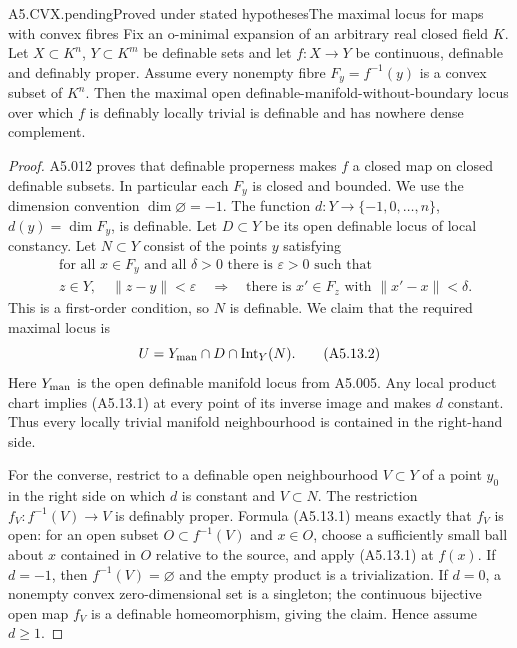\begin{saresult}{A5.CVX.pending}{Proved under stated hypotheses}{The maximal locus for maps with convex fibres}
Fix an o-minimal expansion of an arbitrary real closed field $K$.
Let $X\subset K^n$, $Y\subset K^m$ be definable sets and let
$f:X\to Y$ be continuous, definable and definably proper. Assume every
nonempty fibre $F_y=f^{-1}(y)$ is a convex subset of $K^n$.
Then the maximal open definable-manifold-without-boundary locus over
which $f$ is definably locally trivial is definable and has nowhere
 dense complement.
\end{saresult}
\begin{proof}
A5.012 proves that definable properness makes $f$ a closed map on
closed definable subsets. In particular each $F_y$ is closed and bounded.
We use the dimension convention $\dim\varnothing=-1$. The function
$d:Y\to\{-1,0,\ldots,n\}$, $d(y)=\dim F_y$, is definable. Let $D\subset Y$
be its open definable locus of local constancy. Let $N\subset Y$ consist
of the points $y$ satisfying
\[
\begin{split}
 &\text{for all }x\in F_y\text{ and all }\delta>0\text{ there is }\varepsilon>0
 \text{ such that}\\
 &z\in Y,\quad \|z-y\|<\varepsilon
 \quad\Longrightarrow\quad
 \text{there is }x'\in F_z\text{ with }\|x'-x\|<\delta.
\end{split}                                                        \tag{A5.13.1}
\]
This is a first-order condition, so $N$ is definable. We claim that the
required maximal locus is
\[
                 U=Y_{\rm man}\cap D\cap\operatorname{Int}_Y(N).
                                                                    \tag{A5.13.2}
\]
Here $Y_{\rm man}$ is the open definable manifold locus from A5.005.
Any local product chart implies (A5.13.1) at every point of its inverse
image and makes $d$ constant. Thus every locally trivial manifold
neighbourhood is contained in the right-hand side.

For the converse, restrict to a definable open neighbourhood $V\subset Y$
of a point $y_0$ in the right side on which $d$ is constant and $V\subset N$.
The restriction $f_V:f^{-1}(V)\to V$ is definably proper. Formula (A5.13.1)
means exactly that $f_V$ is open: for an open subset $O\subset f^{-1}(V)$
and $x\in O$, choose a sufficiently small ball about $x$ contained in $O$
relative to the source, and apply (A5.13.1) at $f(x)$.
If $d=-1$, then $f^{-1}(V)=\varnothing$ and the empty product is a
trivialization. If $d=0$, a nonempty convex zero-dimensional set is a
singleton; the continuous bijective open map $f_V$ is a definable
homeomorphism, giving the claim. Hence assume $d\geq1$.


\end{proof}
